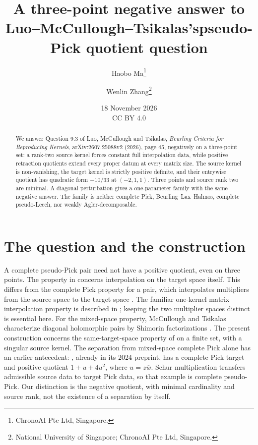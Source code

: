\documentclass[11pt]{article}
\title{A three-point negative answer to\newline
Luo--McCullough--Tsikalas's\newline pseudo-Pick quotient question}
\author{Haobo Ma\thanks{ChronoAI Pte Ltd, Singapore.}\and
Wenlin Zhang\thanks{National University of Singapore; ChronoAI Pte Ltd, Singapore.}}
\date{18 November 2026\\[3pt]\small CC BY 4.0}
\begin{document}
\maketitle
\begin{abstract}
We answer Question 9.3 of Luo, McCullough and Tsikalas,
\emph{Beurling Criteria for Reproducing Kernels}, arXiv:2607.25088v2
(2026), page 45, negatively on a three-point set: a rank-two source kernel
forces constant full interpolation data, while positive retraction quotients
extend every proper datum at every matrix size.
The source kernel is non-vanishing, the target kernel is strictly positive
definite, and their entrywise quotient has quadratic form $-10/33$ at
$(-2,1,1)$. Three points and source rank two are minimal. A diagonal
perturbation gives a one-parameter family with the same negative answer.
The family is neither complete Pick, Beurling--Lax--Halmos, complete
pseudo-Leech, nor weakly Agler-decomposable.
\end{abstract}

\section{The question and the construction}
A complete pseudo-Pick pair need not have a positive quotient, even on
three points. The property in \cite[Definition 9.2]{LMT} concerns interpolation
on the target space itself. This differs from the complete Pick property
for a pair, which interpolates multipliers from the source space to the
target space \cite[Definition 3.25]{LMT}. The familiar one-kernel matrix
interpolation property is described in \cite[Section 0]{AM}; keeping the
two multiplier spaces distinct is essential here. For the mixed-space
property, McCullough and Tsikalas characterize diagonal holomorphic
pairs by Shimorin factorizations \cite[Theorem 1.4]{MT}.
The present construction concerns the same-target-space property of
\cite[Definition 9.2]{LMT} on a finite set, with a singular source kernel.
The separation from mixed-space complete Pick alone has an earlier
antecedent: \cite[Proposition 7.4]{MT}, already in its 2024 preprint,
has a complete Pick target and positive quotient $1+u+4u^2$, where
$u=z\overline w$. Schur multiplication transfers admissible source
data to target Pick data, so that example is complete pseudo-Pick.
Our distinction is the negative quotient, with minimal cardinality
and source rank, not the existence of a separation by itself.
\end{document}
